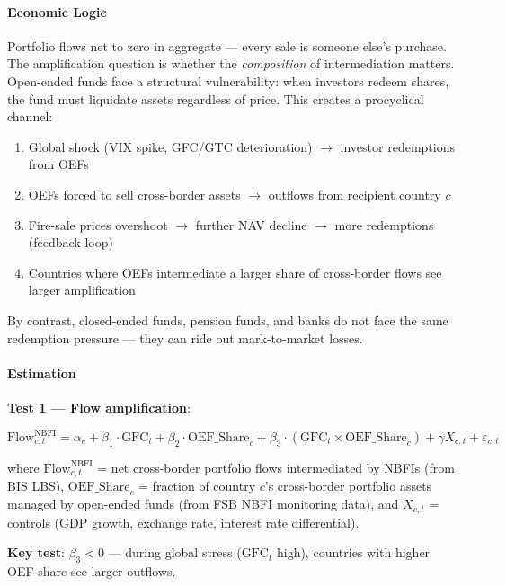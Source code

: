 \documentclass[11pt,a4paper]{article}
\begin{document}
\paragraph{Economic Logic}

Portfolio flows net to zero in aggregate --- every sale is someone else's purchase. The amplification question is whether the \textit{composition} of intermediation matters. Open-ended funds face a structural vulnerability: when investors redeem shares, the fund must liquidate assets regardless of price. This creates a procyclical channel:

\begin{enumerate}
\item Global shock (VIX spike, GFC/GTC deterioration) $\rightarrow$ investor redemptions from OEFs
\item OEFs forced to sell cross-border assets $\rightarrow$ outflows from recipient country $c$
\item Fire-sale prices overshoot $\rightarrow$ further NAV decline $\rightarrow$ more redemptions (feedback loop)
\item Countries where OEFs intermediate a larger share of cross-border flows see larger amplification

\end{enumerate}
By contrast, closed-ended funds, pension funds, and banks do not face the same redemption pressure --- they can ride out mark-to-market losses.


\paragraph{Estimation}

\textbf{Test 1 --- Flow amplification}:

\[\text{Flow}_{c,t}^{\text{NBFI}} = \alpha_c + \beta_1 \cdot \text{GFC}_t + \beta_2 \cdot \text{OEF\_Share}_{c} + \beta_3 \cdot (\text{GFC}_t \times \text{OEF\_Share}_{c}) + \gamma X_{c,t} + \varepsilon_{c,t}\]

where $\text{Flow}_{c,t}^{\text{NBFI}}$ = net cross-border portfolio flows intermediated by NBFIs (from BIS LBS), $\text{OEF\_Share}_{c}$ = fraction of country $c$'s cross-border portfolio assets managed by open-ended funds (from FSB NBFI monitoring data), and $X_{c,t}$ = controls (GDP growth, exchange rate, interest rate differential).

\textbf{Key test}: $\beta_3 < 0$ --- during global stress ($\text{GFC}_t$ high), countries with higher OEF share see larger outflows.
\end{document}
